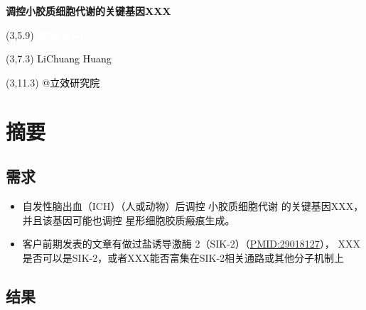 \documentclass[
]{article}
\author{}
\date{\vspace{-2.5em}}
\providecommand{\tightlist}{%
  \setlength{\itemsep}{0pt}\setlength{\parskip}{0pt}}
\begin{document}
\begin{titlepage} 
\begin{center} \textbf{\Huge
调控小胶质细胞代谢的关键基因XXX} \vspace{4em}
\begin{textblock}{10}(3,5.9) \huge
\textbf{\textcolor{white}{2024-05-17}}
\end{textblock} \begin{textblock}{10}(3,7.3)
\Large \textcolor{black}{LiChuang Huang}
\end{textblock} \begin{textblock}{10}(3,11.3)
\Large \textcolor{black}{@立效研究院}
\end{textblock} \end{center} \end{titlepage}
\restoregeometry


\tableofcontents

\listoffigures

\listoftables

\newpage


\hypertarget{abstract}{%
\section{摘要}\label{abstract}}

\hypertarget{ux9700ux6c42}{%
\subsection{需求}\label{ux9700ux6c42}}

\begin{itemize}
\tightlist
\item
  自发性脑出血（ICH）（人或动物）后调控 小胶质细胞代谢 的关键基因XXX，并且该基因可能也调控 星形细胞胶质瘢痕生成。
\item
  客户前期发表的文章有做过盐诱导激酶 2（SIK-2）（\url{PMID:29018127}），
  XXX是否可以是SIK-2，或者XXX能否富集在SIK-2相关通路或其他分子机制上
\end{itemize}

\hypertarget{ux7ed3ux679c}{%
\subsection{结果}\label{ux7ed3ux679c}}
\end{document}
